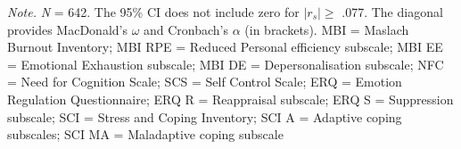 \documentclass[
  man]{apa6}
\newenvironment{lltable}{\begin{landscape}\centering\begin{ThreePartTable}}{\end{ThreePartTable}\end{landscape}}
\begin{document}
\begin{lltable}

\begin{TableNotes}[para]
\normalsize{\textit{Note.} \textit{N} = 642. The 95\% CI does not include zero for $|r_{s}|\geq$ .077. The diagonal provides MacDonald’s $\omega$ and Cronbach’s $\alpha$ (in brackets). MBI = Maslach Burnout Inventory; MBI RPE = Reduced Personal efficiency subscale; MBI EE = Emotional Exhaustion subscale; MBI DE = Depersonalisation subscale; NFC = Need for Cognition Scale; SCS = Self Control Scale; ERQ = Emotion Regulation Questionnaire; ERQ R = Reappraisal subscale; ERQ S = Suppression subscale; SCI = Stress and Coping Inventory; SCI A = Adaptive coping subscales; SCI MA = Maladaptive coping subscale}
\end{TableNotes}

\scriptsize{

}
\end{lltable}
\end{document}

